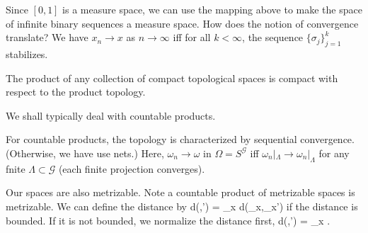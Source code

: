 \documentclass[12pt]{book}
\theoremstyle{norm}
\begin{document}
Since $[0,1]$ is a measure space, we can use the mapping above to make the space of infinite binary sequences a measure space. How does the notion of convergence translate? We have $x_n\to x$ as $n\to \infty$ iff for all $k<\infty$, the sequence $\{\sigma_{j}\}_{j=1}^k$ stabilizes.

\begin{theorem}
The product of any collection of compact topological spaces is compact with respect to the product topology. 
\end{theorem}


We shall typically deal with countable products.

For countable products, the topology is characterized by sequential convergence. (Otherwise, we have use nets.)
Here, $\omega_n\to \omega$ in $\Omega=S^{\mathcal{G}}$ iff $\omega_n|_\Lambda\to \omega_n|_\Lambda$ for any fnite $\Lambda\subset \mathcal{G}$ (each finite projection converges).

Our spaces are also metrizable. Note a countable product of metrizable spaces is metrizable. We can define the distance by
\be
d(\sigma,\sigma') = \sum_x d(\sigma_x,\sigma_x')
\ee
if the distance is bounded. If it is not bounded, we normalize the distance first, 
\be
d(\sigma,\sigma') = \sum_x .
\ee
\end{document}
